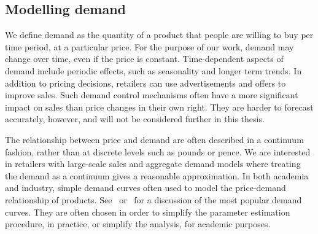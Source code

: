 \documentclass[main.tex]{subfiles}
\begin{document}
\subsection{Modelling demand}\label{sec:intro_model_demand}
We define demand as the quantity of a product that people are willing
to buy per time period, at a particular price. For the purpose of our
work, demand may change over time, even if the price is constant.
Time-dependent aspects of demand include periodic effects, such as
seasonality and longer term trends.
In addition to pricing decisions, retailers can use advertisements and
offers to improve sales. Such demand control mechanisms often have a
more significant impact on sales than price changes in their own
right. They are harder to forecast accurately, however, and will not
be considered further in this thesis.

The relationship between price and demand are often described in a
continuum fashion, rather than at discrete levels such as pounds or
pence. We are interested in retailers with large-scale sales and
aggregate demand models where treating the demand as a continuum gives
a reasonable approximation.
In both academia and industry, simple demand curves often used to
model the price-demand relationship of
products. See~\cite[Ch.~7.3]{talluri2006theory} or~\cite{phillips2005pricing}
for a discussion of the most popular demand curves. They are often
chosen in order to simplify the parameter
estimation procedure, in practice, or simplify the analysis, for academic purposes.
\end{document}
